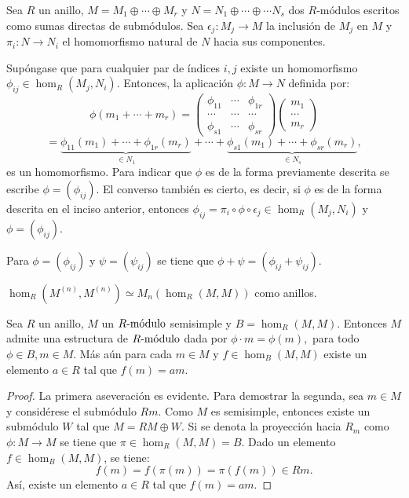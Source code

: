 \begin{lema}\label{lema:estructuraSemi}
Sea $R$ un anillo, $M = M_1 \oplus \cdots \oplus M_r$ y $N = N_1 \oplus \cdots \oplus \cdots N_s$ dos $R\mbox{-módulos}$ escritos como sumas directas de submódulos. Sea $\epsilon_j \colon M_j \to M$ la inclusión de $M_j$ en $M$ y $\pi_i \colon N \to N_i$ el homomorfismo natural de $N$ hacia sus componentes.
\begin{bulletList}
\item Supóngase que para cualquier par de índices $i,j$ existe un homomorfismo $\phi_{ij} \in \hom_R(M_j, N_i)$. Entonces,  la aplicación $\phi \colon M \to N$ definida por: \[\phi(m_1 + \cdots + m_r) = \begin{pmatrix}
\phi_{11} & \cdots & \phi_{1r} \\
\cdots & \cdots & \cdots \\
\phi_{s1} & \cdots & \phi_{sr}
\end{pmatrix} 
\begin{pmatrix}
m_1 \\
\cdots \\
m_r
\end{pmatrix}\]
\[ = \underset{\in N_1}{\underbrace{\phi_{11}(m_1) + \cdots + \phi_{1r}(m_r)}} +\cdots+\underset{\in N_s}{\underbrace{\phi_{s1}(m_1) + \cdots + \phi_{sr}(m_r)}}, \] es un homomorfismo. Para indicar que $\phi$ es de la forma previamente descrita se  escribe $\phi = (\phi_{ij})$. El converso también es cierto, es decir, si $\phi$ es de la forma descrita en el inciso anterior, entonces $\phi_{ij} = \pi_i\circ\phi\circ\epsilon_j \in \hom_R(M_j, N_i)$ y $\phi = (\phi_{ij})$.
\item Para $\phi = (\phi_{ij})$ y $\psi = (\psi_{ij})$ se tiene que $\phi + \psi = (\phi_{ij} +  \psi_{ij})$.
\item $\hom_R(M^{(n)}, M^{(n)}) \simeq M_n(\hom_R(M,M))$ como anillos. 
\end{bulletList} 
\end{lema}
\begin{lema}
Sea $R$ un anillo, $M$ un $\modulo{R}$ semisimple y $B= \hom_R(M,M)$. Entonces $M$  admite una estructura de $\modulo{B}$ dada por $\phi \cdot m = \phi(m),$ para todo $\phi \in B, m \in M$. Más aún para cada $m \in M$ y $f \in \hom_B(M,M)$ existe un elemento $a \in R$ tal que $f(m) = am$.  
\end{lema}
\begin{proof}
La primera aseveración es evidente. Para demostrar la segunda, sea $m \in M$ y considérese el submódulo $Rm$. Como $M$ es semisimple, entonces existe un submódulo $W$ tal que $M = RM \oplus W$. Si se denota  la proyección hacia $R_m$ como $\phi \colon M \to M$ se tiene que $\pi \in \hom_R(M,M) = B$. Dado un elemento $f \in \hom_B(M,M)$, se tiene:\[ f(m) = f(\pi(m)) = \pi(f(m)) \in Rm. \] Así, existe un elemento $a \in R$ tal que $f(m) = am$. 
\end{proof}
